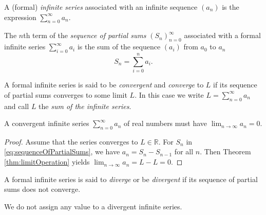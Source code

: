 \begin{defn}%
  \label{def:seriesFromSequence}
  A (formal) \emph{infinite series} associated with an infinite sequence $(a_n)$
   is the expression $\sum_{n=0}^{\infty} a_n$.
\end{defn}

\begin{defn}
  \label{def:sequenceOfPartialSums}
  The $n$th term of the \emph{sequence of partial sums}
  $(S_n)_{n=0}^{\infty}$ associated with a formal infinite series
  $\sum_{i=0}^{\infty} a_i$
  is the sum of the sequence $(a_i)$ from $a_0$ to $a_n$
  \begin{equation}
    \label{eq:sequenceOfPartialSums}
    S_n = \sum_{i=0}^{n} a_i.
  \end{equation}
\end{defn}

\begin{defn}
  A formal infinite series is said to be \emph{convergent}
  and \emph{converge} to $L$
  if its sequence of partial sums converges to some limit $L$.
  In this case we write $L=\sum_{n=0}^{\infty} a_n$
  and call $L$ the \emph{sum of the infinite series}.
\end{defn}

\begin{lem}
  \label{lem:seriesConvergeNecessity}
  A convergent infinite series $\sum_{n=0}^{\infty}a_{n}$ of real numbers
  must have $\lim_{n\rightarrow \infty}a_{n}=0$.
\end{lem}
\begin{proof}
  Assume that the series converges to $L\in \mathbb{R}$.
  For $S_{n}$ in \eqref{eq:sequenceOfPartialSums}, 
  we have $a_{n}=S_{n}-S_{n-1}$ for all $n$. 
  Then Theorem \ref{thm:limitOperation} yields
  $\lim_{n\rightarrow \infty}a_{n}=L-L=0$.
\end{proof}

\begin{defn}
  A formal infinite series is said to \emph{diverge}
  or be \emph{divergent}
  if its sequence of partial sums does not converge.
\end{defn}

\begin{rem}
  We do not assign any value to a divergent infinite series.
\end{rem}

